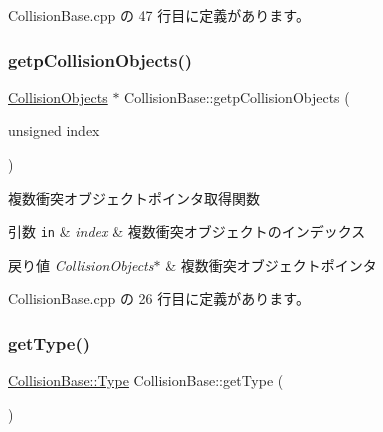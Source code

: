  Collision\+Base.\+cpp の 47 行目に定義があります。

\mbox{\label{class_collision_base_a2b0a626608545c202ef89d859b3d47b7}} 
\subsubsection{\texorpdfstring{getp\+Collision\+Objects()}{getpCollisionObjects()}}
{\footnotesize\ttfamily \mbox{\hyperlink{class_collision_objects}{Collision\+Objects}} $\ast$ Collision\+Base\+::getp\+Collision\+Objects (\begin{DoxyParamCaption}\item[{unsigned}]{index }\end{DoxyParamCaption})}



複数衝突オブジェクトポインタ取得関数 


\begin{DoxyParams}[1]{引数}
\mbox{\tt in}  & {\em index} & 複数衝突オブジェクトのインデックス \\
\hline
\end{DoxyParams}

\begin{DoxyRetVals}{戻り値}
{\em Collision\+Objects$\ast$} & 複数衝突オブジェクトポインタ \\
\hline
\end{DoxyRetVals}


 Collision\+Base.\+cpp の 26 行目に定義があります。

\mbox{\label{class_collision_base_a9ab6ff88dc0379278229342d4e016744}} 
\subsubsection{\texorpdfstring{get\+Type()}{getType()}}
{\footnotesize\ttfamily \mbox{\hyperlink{class_collision_base_a18dc0d5461742083ca12013fe9ff1a20}{Collision\+Base\+::\+Type}} Collision\+Base\+::get\+Type (\begin{DoxyParamCaption}{ }\end{DoxyParamCaption})}



